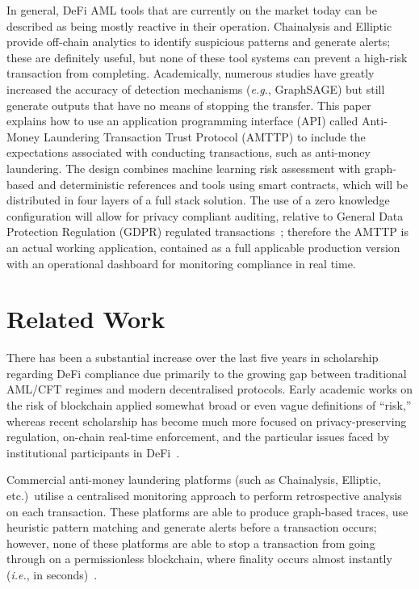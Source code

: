 \documentclass[journal]{IEEEtran}
\newcommand{\ie}{\textit{i.e.}}
\newcommand{\eg}{\textit{e.g.}}
\begin{document}
In general, DeFi AML tools that are currently on the market today can be described as being mostly reactive in their operation. Chainalysis and Elliptic provide off-chain analytics to identify suspicious patterns and generate alerts; these are definitely useful, but none of these tool systems can prevent a high-risk transaction from completing. Academically, numerous studies have greatly increased the accuracy of detection mechanisms (\eg, GraphSAGE) but still generate outputs that have no means of stopping the transfer. This paper explains how to use an application programming interface (API) called Anti-Money Laundering Transaction Trust Protocol (AMTTP) to include the expectations associated with conducting transactions, such as anti-money laundering. The design combines machine learning risk assessment with graph-based and deterministic references and tools using smart contracts, which will be distributed in four layers of a full stack solution. The use of a zero knowledge configuration will allow for privacy compliant auditing, relative to General Data Protection Regulation (GDPR) regulated transactions~\cite{groth2016}; therefore the AMTTP is an actual working application, contained as a full applicable production version with an operational dashboard for monitoring compliance in real time.

\section{Related Work}

There has been a substantial increase over the last five years in scholarship regarding DeFi compliance due primarily to the growing gap between traditional AML/CFT regimes and modern decentralised protocols. Early academic works on the risk of blockchain applied somewhat broad or even vague definitions of ``risk,'' whereas recent scholarship has become much more focused on privacy-preserving regulation, on-chain real-time enforcement, and the particular issues faced by institutional participants in DeFi~\cite{joseph2025}.

Commercial anti-money laundering platforms (such as Chainalysis, Elliptic, etc.)\ utilise a centralised monitoring approach to perform retrospective analysis on each transaction. These platforms are able to produce graph-based traces, use heuristic pattern matching and generate alerts before a transaction occurs; however, none of these platforms are able to stop a transaction from going through on a permissionless blockchain, where finality occurs almost instantly (\ie, in seconds)~\cite{memgraph2024}.
\end{document}

